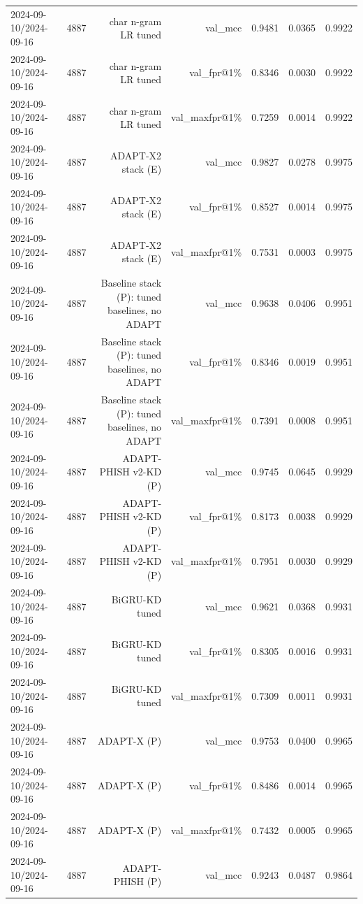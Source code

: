 \begin{table}[t]
\begin{tabular}{llrrrrr}
2024-09-10/2024-09-16 & 4887 & char n-gram LR tuned & val\_mcc & 0.9481 & 0.0365 & 0.9922 \\
2024-09-10/2024-09-16 & 4887 & char n-gram LR tuned & val\_fpr@1\% & 0.8346 & 0.0030 & 0.9922 \\
2024-09-10/2024-09-16 & 4887 & char n-gram LR tuned & val\_maxfpr@1\% & 0.7259 & 0.0014 & 0.9922 \\
2024-09-10/2024-09-16 & 4887 & ADAPT-X2 stack (E) & val\_mcc & 0.9827 & 0.0278 & 0.9975 \\
2024-09-10/2024-09-16 & 4887 & ADAPT-X2 stack (E) & val\_fpr@1\% & 0.8527 & 0.0014 & 0.9975 \\
2024-09-10/2024-09-16 & 4887 & ADAPT-X2 stack (E) & val\_maxfpr@1\% & 0.7531 & 0.0003 & 0.9975 \\
2024-09-10/2024-09-16 & 4887 & Baseline stack (P): tuned baselines, no ADAPT & val\_mcc & 0.9638 & 0.0406 & 0.9951 \\
2024-09-10/2024-09-16 & 4887 & Baseline stack (P): tuned baselines, no ADAPT & val\_fpr@1\% & 0.8346 & 0.0019 & 0.9951 \\
2024-09-10/2024-09-16 & 4887 & Baseline stack (P): tuned baselines, no ADAPT & val\_maxfpr@1\% & 0.7391 & 0.0008 & 0.9951 \\
2024-09-10/2024-09-16 & 4887 & ADAPT-PHISH v2-KD (P) & val\_mcc & 0.9745 & 0.0645 & 0.9929 \\
2024-09-10/2024-09-16 & 4887 & ADAPT-PHISH v2-KD (P) & val\_fpr@1\% & 0.8173 & 0.0038 & 0.9929 \\
2024-09-10/2024-09-16 & 4887 & ADAPT-PHISH v2-KD (P) & val\_maxfpr@1\% & 0.7951 & 0.0030 & 0.9929 \\
2024-09-10/2024-09-16 & 4887 & BiGRU-KD tuned & val\_mcc & 0.9621 & 0.0368 & 0.9931 \\
2024-09-10/2024-09-16 & 4887 & BiGRU-KD tuned & val\_fpr@1\% & 0.8305 & 0.0016 & 0.9931 \\
2024-09-10/2024-09-16 & 4887 & BiGRU-KD tuned & val\_maxfpr@1\% & 0.7309 & 0.0011 & 0.9931 \\
2024-09-10/2024-09-16 & 4887 & ADAPT-X (P) & val\_mcc & 0.9753 & 0.0400 & 0.9965 \\
2024-09-10/2024-09-16 & 4887 & ADAPT-X (P) & val\_fpr@1\% & 0.8486 & 0.0014 & 0.9965 \\
2024-09-10/2024-09-16 & 4887 & ADAPT-X (P) & val\_maxfpr@1\% & 0.7432 & 0.0005 & 0.9965 \\
2024-09-10/2024-09-16 & 4887 & ADAPT-PHISH (P) & val\_mcc & 0.9243 & 0.0487 & 0.9864 \\

\end{tabular}
\end{table}
